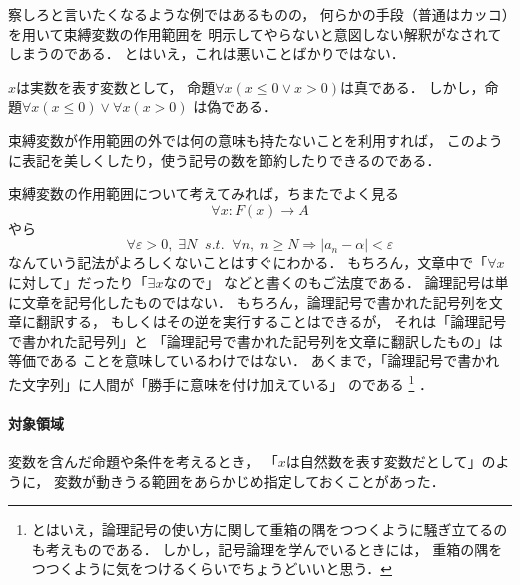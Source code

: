  察しろと言いたくなるような例ではあるものの，
 何らかの手段（普通はカッコ）を用いて束縛変数の作用範囲を
 明示してやらないと意図しない解釈がなされてしまうのである．
 とはいえ，これは悪いことばかりではない．
 
 \begin{ex}
   $x$は実数を表す変数として，
   命題$\forall x ( {x \leq 0} \lor {x > 0})$は真である．
   しかし，命題$\forall x (x \leq 0 ) \lor \forall x (x >0) $
   は偽である．
 \end{ex}
 
 束縛変数が作用範囲の外では何の意味も持たないことを利用すれば，
 このように表記を美しくしたり，使う記号の数を節約したりできるのである．

 束縛変数の作用範囲について考えてみれば，ちまたでよく見る
 \[
   \forall x : F(x) \to A 
 \]
 やら
 \[
   \forall \varepsilon > 0 , \;  \exists N \;\; s.t. \;\; \forall n , \; n \geq N \Longrightarrow 
   \lvert a_n - \alpha \rvert < \varepsilon
 \]
 なんていう記法がよろしくないことはすぐにわかる．
 もちろん，文章中で「$\forall x$に対して」だったり「$\exists x$なので」
 などと書くのもご法度である．
 論理記号は単に文章を記号化したものではない．
 もちろん，論理記号で書かれた記号列を文章に翻訳する，
 もしくはその逆を実行することはできるが，
 それは「論理記号で書かれた記号列」と
 「論理記号で書かれた記号列を文章に翻訳したもの」は等価である
 ことを意味しているわけではない．
 あくまで，「論理記号で書かれた文字列」に人間が「勝手に意味を付け加えている」
 のである
 \footnote{とはいえ，論理記号の使い方に関して重箱の隅をつつくように騒ぎ立てるのも考えものである．
   しかし，記号論理を学んでいるときには，
 重箱の隅をつつくように気をつけるくらいでちょうどいいと思う．}
 ．

 \paragraph{対象領域}
 変数を含んだ命題や条件を考えるとき，
 「$x$は自然数を表す変数だとして」のように，
 変数が動きうる範囲をあらかじめ指定しておくことがあった．

